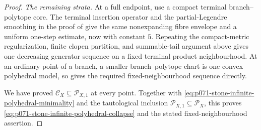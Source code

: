 \begin{proof}
\medskip\noindent
\emph{The remaining strata.}
At a full endpoint, use a compact terminal branch--polytope core.  The
terminal insertion operator and the partial-Legendre smoothing in the
proof of  give the same
nonexpanding fibre envelope and a uniform one-step estimate, now with
constant $5$.  Repeating the compact-metric regularization, finite clopen
partition, and summable-tail argument above gives one decreasing generator
sequence on a fixed terminal product neighbourhood.  At an ordinary point
of a branch, a smaller branch--polytope chart is one convex polyhedral
model, so  gives the required
fixed-neighbourhood sequence directly.

We have proved $\mathcal C_X\subseteq\mathcal P_{X,1}$ at every point.
Together with \eqref{eq:p071-stone-infinite-polyhedral-minimality} and the
tautological inclusion $\mathcal P_{X,1}\subseteq\mathcal P_X$, this
proves \eqref{eq:p071-stone-infinite-polyhedral-collapse} and the stated
fixed-neighbourhood assertion.
\end{proof}
